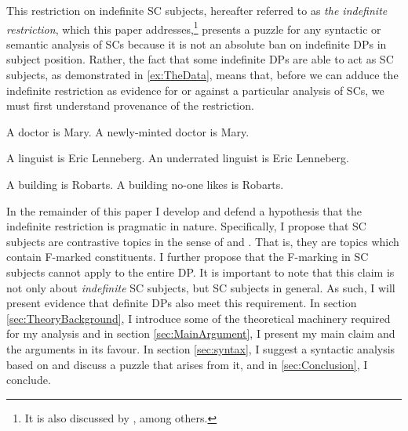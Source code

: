 \documentclass[
	letterpaper,
]{article}
\begin{document}
This restriction on indefinite SC subjects, hereafter referred to as \textit{the indefinite restriction}, which this paper addresses,\footnote{
	It is also discussed by \textcite{mikkelsen2005copular,halliday1967notes,higgins1973pseudo,heggie1988diss,heycock1994internal,williams1997asymmetry}, among others.
} presents a puzzle for any syntactic or semantic analysis of SCs because it is not an absolute ban on indefinite DPs in subject position.
Rather, the fact that some indefinite DPs are able to act as SC subjects, as demonstrated in \ref{ex:TheData}, means that, before we can adduce the indefinite restriction as evidence for or against a particular analysis of SCs, we must first understand provenance of the restriction.
\begin{exe}
	\ex\label{ex:TheData}
	\begin{xlist}
		\ex
		\begin{xlist}
			\ex[*] A doctor is Mary.
			\ex A newly-minted doctor is Mary.	
		\end{xlist}
		\ex
		\begin{xlist}
			\ex[*] A linguist is Eric Lenneberg.
			\ex An underrated linguist is Eric Lenneberg.	
		\end{xlist}
		\ex
		\begin{xlist}
			\ex[*] A building is Robarts.
			\ex A building no-one likes is Robarts.	
		\end{xlist}
	\end{xlist}
\end{exe}

In the remainder of this paper I develop and defend a hypothesis that the indefinite restriction is pragmatic in nature.
Specifically, I propose that SC subjects are contrastive topics in the sense of \textcite{buring2003d} and \textcite{constant2014diss}.
That is, they are topics which contain F-marked constituents.
I further propose that the F-marking in SC subjects cannot apply to the entire DP.
It is important to note that this claim is not only about \textit{indefinite} SC subjects, but SC subjects in general.
As such, I will present evidence that definite DPs also meet this requirement.
In section \ref{sec:TheoryBackground}, I introduce some of the theoretical machinery required for my analysis and in section \ref{sec:MainArgument}, I present my main claim and the arguments in its favour.
In section \ref{sec:syntax}, I suggest a syntactic analysis based on \textcite{constant2014diss} and discuss a puzzle that arises from it, and in \ref{sec:Conclusion}, I conclude.
\end{document}
